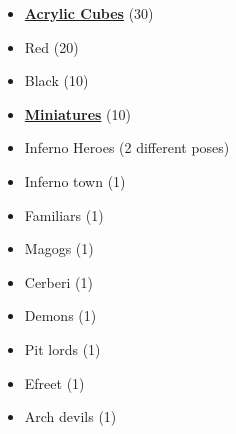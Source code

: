 \documentclass[12pt]{article}
\begin{document}
\begin{multicols}{3}
\begin{itemize}[leftmargin=0pt, label={}, noitemsep, noitemsep]
  \item \textbf{\underline{Acrylic Cubes}} (30)
  \item Red (20)
  \item Black (10)
\end{itemize}

\begin{itemize}[leftmargin=0pt, label={}, noitemsep, noitemsep]
  \item \textbf{\underline{Miniatures}} (10)
  \item Inferno Heroes (2 different poses)
  \item Inferno town (1)
  \item Familiars (1)
  \item Magogs (1)
  \item Cerberi (1)
  \item Demons (1)
  \item Pit lords (1)
  \item Efreet (1)
  \item Arch devils (1)
\end{itemize}


\end{multicols}
\end{document}
